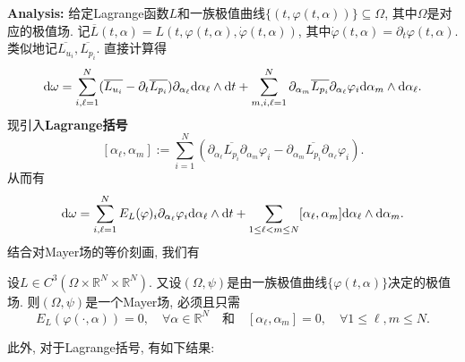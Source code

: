 \textbf{Analysis:} 给定Lagrange函数$L$和一族极值曲线$\{(t, \varphi(t, \alpha))\} \subseteq \Omega$, 其中$\Omega$是对应的极值场.
记$\overline{L}(t, \alpha) = L(t, \varphi(t, \alpha), \dot\varphi(t, \alpha))$, 其中$\dot\varphi(t, \alpha) = \partial_t\varphi(t, \alpha)$.
类似地记$\overline{L_{u_i}}, \overline{L_{p_i}}$. 直接计算得 
\begin{equation*}
    {\rm d}\omega = \sum_{i, \ell = 1}^N(\overline{L_{u_i}} - \partial_t\overline{L_{p_i}})\partial_{\alpha_\ell} {\rm d}\alpha_{\ell} \wedge {\rm d}t + \sum_{m, i, \ell = 1}^N\partial_{\alpha_m}\overline{L_{p_i}}\partial_{\alpha_{\ell}}\varphi_i {\rm d}\alpha_m \wedge {\rm d}\alpha_{\ell}.
\end{equation*}
现引入\textbf{Lagrange括号}
\begin{equation*}
    \boxed{[\alpha_\ell, \alpha_m] := \sum_{i = 1}^N(\partial_{\alpha_\ell}\overline{L_{p_i}}\partial_{\alpha_m}\varphi_i - \partial_{\alpha_m}\overline{L_{p_i}}\partial_{\alpha_\ell}\varphi_i).}
\end{equation*}
从而有
\begin{equation*}
    {\rm d}\omega = \sum_{i, \ell = 1}^NE_L(\varphi)_i\partial_{\alpha_\ell}\varphi_i {\rm d}\alpha_{\ell} \wedge {\rm d}t + \sum_{1 \leq \ell < m \leq N}[\alpha_\ell, \alpha_m] {\rm d}\alpha_{\ell} \wedge {\rm d}\alpha_m.
\end{equation*}
结合对Mayer场的等价刻画, 我们有

\begin{lemma}
    设$L \in C^3(\Omega \times \mathbb{R}^N \times \mathbb{R}^N)$. 又设$(\Omega, \psi)$是由一族极值曲线$\{\varphi(t, \alpha)\}$决定的极值场.
    则$(\Omega, \psi)$是一个Mayer场, 必须且只需 
    \begin{equation*}
        E_L(\varphi(\cdot, \alpha)) = 0, \quad \forall \alpha \in \mathbb{R}^N \quad \text{和} \quad [\alpha_{\ell}, \alpha_m] = 0, \quad \forall 1 \leq \ell, m \leq N.
    \end{equation*}
\end{lemma}

此外, 对于Lagrange括号, 有如下结果:

